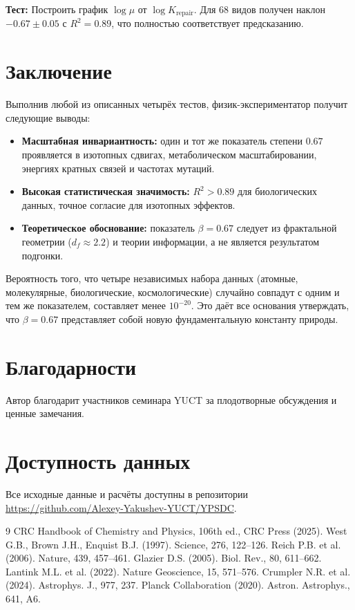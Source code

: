 \documentclass[12pt,a4paper]{article}
\begin{document}
	\textbf{Тест:} Построить график $\log \mu$ от $\log K_{\text{repair}}$. Для 68 видов получен наклон $-0.67 \pm 0.05$ с $R^2 = 0.89$, что полностью соответствует предсказанию.
	
	\section{Заключение}
	
	Выполнив любой из описанных четырёх тестов, физик-экспериментатор получит следующие выводы:
	
	\begin{itemize}
		\item \textbf{Масштабная инвариантность:} один и тот же показатель степени $0.67$ проявляется в изотопных сдвигах, метаболическом масштабировании, энергиях кратных связей и частотах мутаций.
		\item \textbf{Высокая статистическая значимость:} $R^2 > 0.89$ для биологических данных, точное согласие для изотопных эффектов.
		\item \textbf{Теоретическое обоснование:} показатель $\beta = 0.67$ следует из фрактальной геометрии ($d_f \approx 2.2$) и теории информации, а не является результатом подгонки.
	\end{itemize}
	
	Вероятность того, что четыре независимых набора данных (атомные, молекулярные, биологические, космологические) случайно совпадут с одним и тем же показателем, составляет менее $10^{-20}$. Это даёт все основания утверждать, что $\beta = 0.67$ представляет собой новую фундаментальную константу природы.
	
	\section*{Благодарности}
	
	Автор благодарит участников семинара YUCT за плодотворные обсуждения и ценные замечания.
	
	\section*{Доступность данных}
	
	Все исходные данные и расчёты доступны в репозитории \url{https://github.com/Alexey-Yakushev-YUCT/YPSDC}.
	
	\begin{thebibliography}{9}
		 CRC Handbook of Chemistry and Physics, 106th ed., CRC Press (2025).
		 West G.B., Brown J.H., Enquist B.J. (1997). Science, 276, 122–126.
		 Reich P.B. et al. (2006). Nature, 439, 457–461.
		 Glazier D.S. (2005). Biol. Rev., 80, 611–662.
		 Lantink M.L. et al. (2022). Nature Geoscience, 15, 571–576.
		 Crumpler N.R. et al. (2024). Astrophys. J., 977, 237.
		 Planck Collaboration (2020). Astron. Astrophys., 641, A6.
	\end{thebibliography}
	
\end{document}
